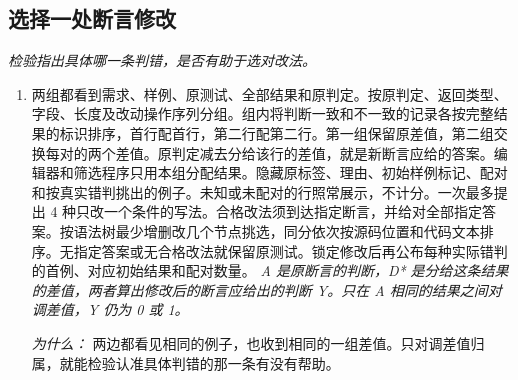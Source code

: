 \documentclass[10pt,a4paper]{article}
\begin{document}
\subsection*{选择一处断言修改}
\emph{检验指出具体哪一条判错，是否有助于选对改法。}
\begin{enumerate}[leftmargin=*,start=4]
  \item 两组都看到需求、样例、原测试、全部结果和原判定。按原判定、返回类型、字段、长度及改动操作序列分组。组内将判断一致和不一致的记录各按完整结果的标识排序，首行配首行，第二行配第二行。第一组保留原差值，第二组交换每对的两个差值。原判定减去分给该行的差值，就是新断言应给的答案。编辑器和筛选程序只用本组分配结果。隐藏原标签、理由、初始样例标记、配对和按真实错判挑出的例子。未知或未配对的行照常展示，不计分。一次最多提出 4 种只改一个条件的写法。合格改法须到达指定断言，并给对全部指定答案。按语法树最少增删改几个节点挑选，同分依次按源码位置和代码文本排序。无指定答案或无合格改法就保留原测试。锁定修改后再公布每种实际错判的首例、对应初始结果和配对数量。
\noindent\emph{A 是原断言的判断，D* 是分给这条结果的差值，两者算出修改后的断言应给出的判断 Y。只在 A 相同的结果之间对调差值，Y 仍为 0 或 1。}
\par{}
\par\emph{为什么：} 两边都看见相同的例子，也收到相同的一组差值。只对调差值归属，就能检验认准具体判错的那一条有没有帮助。
\end{enumerate}
\end{document}
